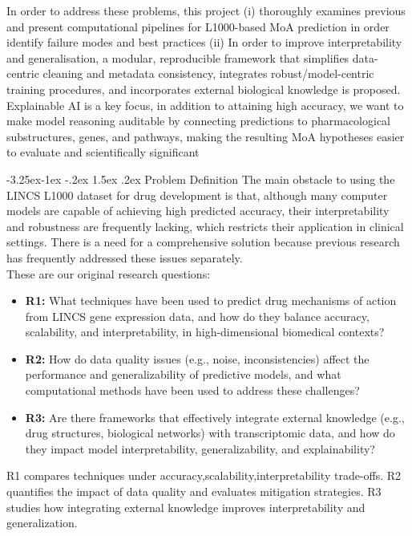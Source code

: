 \documentclass[12pt,a4paper]{article}
\makeatletter
\renewcommand\subsection{\@startsection{subsection}{2}{\z@}%
  {-3.25ex\@plus-1ex \@minus-.2ex}%
  {1.5ex \@plus.2ex}%
  {\normalfont\normalsize\bfseries}}
\makeatother
\begin{document}
In order to address these problems, this project (i) thoroughly examines previous and present computational pipelines for L1000-based MoA prediction in order identify failure modes and best practices (ii) In order to improve interpretability and generalisation, a modular, reproducible framework that simplifies data-centric cleaning and metadata consistency, integrates robust/model-centric training procedures, and incorporates external biological knowledge is proposed. Explainable AI is a key focus, in addition to attaining high accuracy, we want to make model reasoning auditable by connecting predictions to pharmacological substructures, genes, and pathways, making the resulting MoA hypotheses easier to evaluate and scientifically significant\cite{duan2016l1000cds2,stahlschmidt2022multimodal,samal2022opportunities}


\subsection{Problem Definition}
The main obstacle to using the LINCS L1000 dataset for drug development is that, although many computer models are capable of achieving high predicted accuracy, their interpretability and robustness are frequently lacking, which restricts their application in clinical settings.  There is a need for a comprehensive solution because previous research has frequently addressed these issues separately.\\
These are our original research questions:
\begin{itemize}  
  \item \textbf{R1:} What techniques have been used to predict drug mechanisms of action from LINCS gene expression data, and how do they balance accuracy, scalability, and interpretability, in high-dimensional biomedical contexts?
  \item \textbf{R2:} How do data quality issues (e.g., noise, inconsistencies) affect the performance and generalizability of predictive models, and what computational methods have been used to address these challenges?
  \item \textbf{R3:} Are there frameworks that effectively integrate external knowledge (e.g., drug structures, biological networks) with transcriptomic data, and how do they impact model interpretability, generalizability, and explainability?
\end{itemize}

R1 compares techniques under accuracy,scalability,interpretability trade-offs. R2 quantifies the impact of data quality and evaluates mitigation strategies. R3 studies how integrating external knowledge improves interpretability and generalization.
\end{document}
